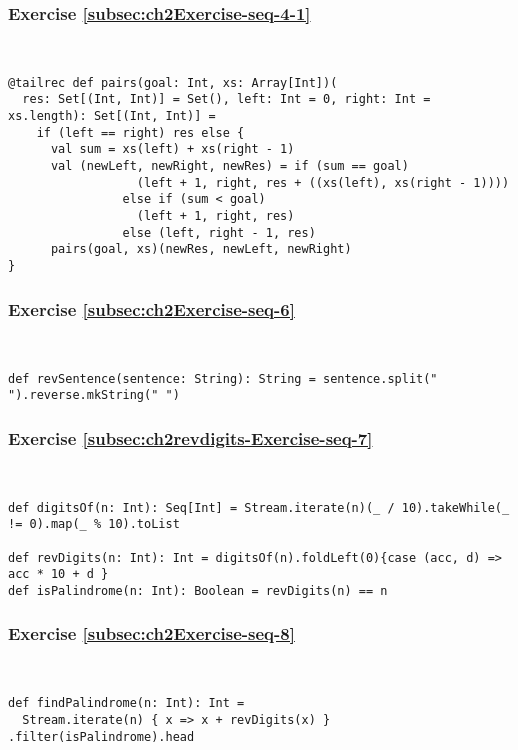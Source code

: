 \subsubsection*{Exercise \ref{subsec:ch2Exercise-seq-4-1}}

~
\begin{lstlisting}
@tailrec def pairs(goal: Int, xs: Array[Int])(
  res: Set[(Int, Int)] = Set(), left: Int = 0, right: Int = xs.length): Set[(Int, Int)] =
    if (left == right) res else {
      val sum = xs(left) + xs(right - 1)
      val (newLeft, newRight, newRes) = if (sum == goal) 
                  (left + 1, right, res + ((xs(left), xs(right - 1)))) 
                else if (sum < goal)
                  (left + 1, right, res)
                else (left, right - 1, res)
      pairs(goal, xs)(newRes, newLeft, newRight)
}
\end{lstlisting}


\subsubsection*{Exercise \ref{subsec:ch2Exercise-seq-6}}

~
\begin{lstlisting}
def revSentence(sentence: String): String = sentence.split(" ").reverse.mkString(" ")
\end{lstlisting}


\subsubsection*{Exercise \ref{subsec:ch2revdigits-Exercise-seq-7}}

~
\begin{lstlisting}
def digitsOf(n: Int): Seq[Int] = Stream.iterate(n)(_ / 10).takeWhile(_ != 0).map(_ % 10).toList

def revDigits(n: Int): Int = digitsOf(n).foldLeft(0){case (acc, d) => acc * 10 + d }
def isPalindrome(n: Int): Boolean = revDigits(n) == n
\end{lstlisting}


\subsubsection*{Exercise \ref{subsec:ch2Exercise-seq-8}}

~
\begin{lstlisting}
def findPalindrome(n: Int): Int = 
  Stream.iterate(n) { x => x + revDigits(x) } .filter(isPalindrome).head
\end{lstlisting}


